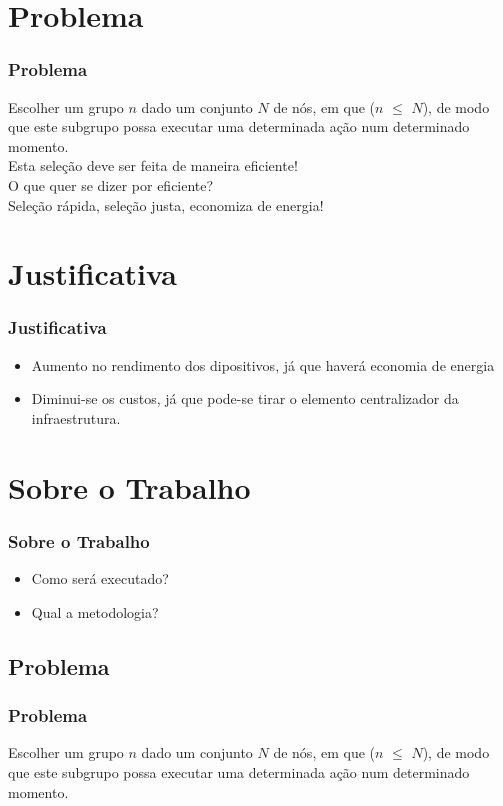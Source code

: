 \documentclass{beamer}
\begin{document}
\section{Problema}
\begin{frame}
    \frametitle{Problema}
    \pause Escolher um grupo $n$ dado um conjunto $N$ de nós, em que ($n$
    $\leqslant$ $N$), de modo que este subgrupo possa executar uma determinada ação num
    determinado momento.\\
    \pause Esta seleção deve ser feita de maneira eficiente!\\
    \pause O que quer se dizer por eficiente?\\
    \pause Seleção rápida, seleção justa, economiza de energia!
\end{frame}

\section{Justificativa}
\begin{frame}
    \frametitle{Justificativa}
    \begin{itemize}
      \item Aumento no rendimento dos dipositivos, já que haverá economia de
      energia
      \item Diminui-se os custos, já que pode-se tirar o elemento centralizador
      da infraestrutura.
    \end{itemize}
\end{frame}


\section{Sobre o Trabalho}
\begin{frame}
    \frametitle{Sobre o Trabalho}
    \begin{itemize}
        \item Como será executado?
        \item Qual a metodologia?
    \end{itemize}
\end{frame}


\subsection{Problema}
\begin{frame}
    \frametitle{Problema}
    Escolher um grupo $n$ dado um conjunto $N$ de nós, em que ($n$ $\leqslant$
    $N$), de modo que este subgrupo possa executar uma determinada ação num determinado momento.
\end{frame}
\end{document}
